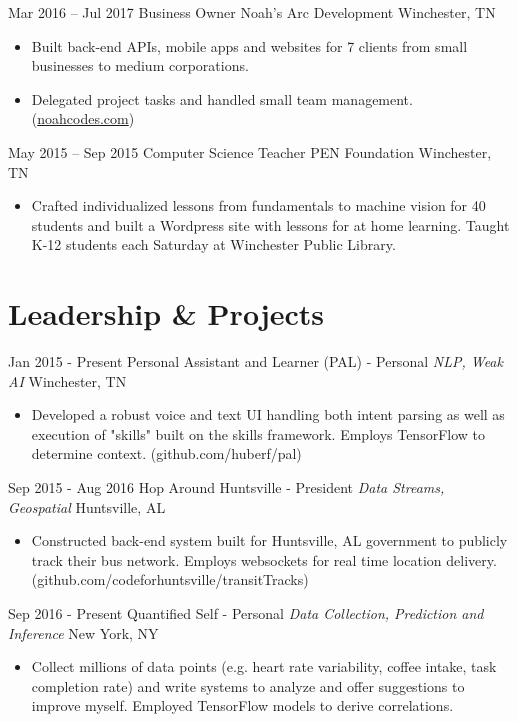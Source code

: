 \documentclass[letterpaper]{moderncv}        %
\begin{document}
\cventry
{Mar 2016 -- Jul 2017}
{Business Owner}
{Noah's Arc Development}
{Winchester, TN}
{}
{\begin{itemize}%
	\item  Built back-end APIs, mobile apps and websites for 7 clients from small businesses to medium corporations.
	\item  Delegated project tasks and handled small team management. (\href{https://noahcodes.com/}{noahcodes.com})
	\end{itemize}}
\iffalse
\cventry
{May 2015 -- Jun 2017}
{Web Store Admin}
{The Mountain Outfitter's}
{Monteagle, TN}
{}
{\begin{itemize}%
	\item  Executed multiple full site server migrations and data recovery after attempted hack.
	\item  Setup Yii (PHP) based CMS and inventory management system and improved checkout flow.
	\item  Additional payment option integration led to 30\% more transactions.
	\end{itemize}}
\fi
\cventry
{May 2015 -- Sep 2015}
{Computer Science Teacher}
{PEN Foundation}
{Winchester, TN}
{}
{\begin{itemize}%
	\item  Crafted individualized lessons from fundamentals to machine vision for 40 students and built a Wordpress site with lessons for at home learning. Taught K-12 students each Saturday at Winchester Public Library.
	\end{itemize}}
    \section{Leadership \& Projects}
\cventry
{Jan 2015 - Present}
{Personal Assistant and Learner (PAL) - Personal}
{}
{\textit{NLP, Weak AI}}
{Winchester, TN}
{\begin{itemize}%
	\item Developed a robust voice and text UI handling both intent parsing as well as execution of "skills" built on the skills framework. Employs TensorFlow to determine context. (github.com/huberf/pal)
\end{itemize}}
\cventry
{Sep 2015 - Aug 2016}
{Hop Around Huntsville - President}
{}
{\textit{Data Streams, Geospatial}}
{Huntsville, AL}
{\begin{itemize}%
\item Constructed back-end system built for Huntsville, AL government to publicly track their bus network. Employs websockets for real time location delivery. (github.com/codeforhuntsville/transitTracks)
\end{itemize}}
\cventry
{Sep 2016 - Present}
{Quantified Self - Personal}
{}
{\textit{Data Collection, Prediction and Inference}}
{New York, NY}
{\begin{itemize}%
\item Collect millions of data points (e.g. heart rate variability, coffee intake, task
completion rate) and write systems to analyze and offer suggestions to improve myself. Employed TensorFlow models to derive correlations.
\end{itemize}}
    
\end{document}
